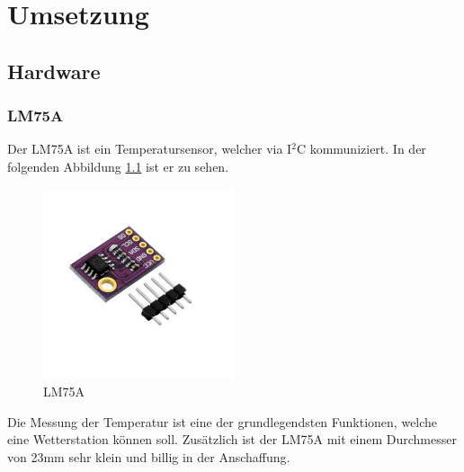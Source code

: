


\chapter{Umsetzung}

\section{Hardware}

\subsection{LM75A}\label{ref:LM75A}

    Der LM75A ist ein Temperatursensor, welcher via I$^2$C kommuniziert. In der folgenden Abbildung \ref{fig:LM75A} ist er zu sehen.

    \begin{figure}[H]
        \centering
        \includegraphics[width=0.5\textwidth]{./media/images/lm.jpg}
        \caption{LM75A\cite{bib:LM75A}}
        \label{fig:LM75A}
    \end{figure}

    Die Messung der Temperatur ist eine der grundlegendsten Funktionen, welche eine Wetterstation können soll. Zusätzlich ist der LM75A mit einem Durchmesser von 23mm sehr klein und billig in der Anschaffung. 
    
